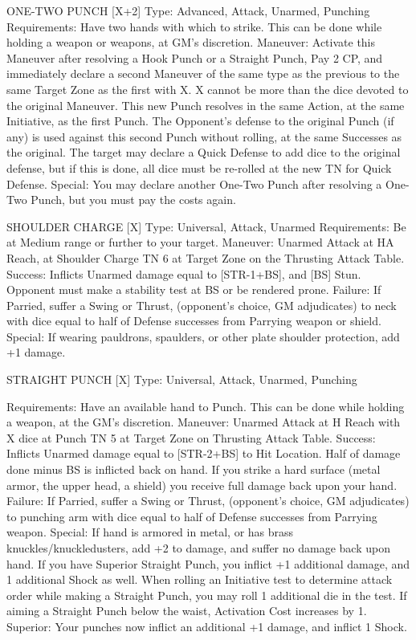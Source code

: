 \documentclass[oneside,11pt,english]{book}
\begin{document}
ONE-TWO PUNCH [X+2] 
Type: Advanced, Attack, Unarmed, Punching 
Requirements: Have two hands with which to strike. This can be done while holding a weapon or 
weapons, at GM’s discretion. 
Maneuver: Activate this Maneuver after resolving a Hook Punch or a Straight Punch, Pay 2 CP, and 
immediately declare a second Maneuver of the same type as the previous to the same Target Zone as the 
first with X. X cannot be more than the dice devoted to the original Maneuver. This new Punch resolves 
in the same Action, at the same Initiative, as the first Punch. The Opponent’s defense to the original 
Punch (if any) is used against this second Punch without rolling, at the same Successes as the original. 
The target may declare a Quick Defense to add dice to the original defense, but if this is done, all dice 
must be re-rolled at the new TN for Quick Defense. 
Special: You may declare another One-Two Punch after resolving a One-Two Punch, but you must pay 
the costs again. 

 

SHOULDER CHARGE [X] 
Type: Universal, Attack, Unarmed 
Requirements: Be at Medium range or further to your target. 
Maneuver: Unarmed Attack at HA Reach, at Shoulder Charge TN 6 at Target Zone on the Thrusting 
Attack Table. 
Success: Inflicts Unarmed damage equal to [STR-1+BS], and [BS] Stun. Opponent must make a stability 
test at BS or be rendered prone. 
Failure: If Parried, suffer a Swing or Thrust, (opponent’s choice, GM adjudicates) to neck with dice 
equal to half of Defense successes from Parrying weapon or shield. 
Special: If wearing pauldrons, spaulders, or other plate shoulder protection, add +1 damage. 

 

STRAIGHT PUNCH [X] 
Type: Universal, Attack, Unarmed, Punching 


Requirements: Have an available hand to Punch. This can be done while holding a weapon, at the GM's 
discretion. 
Maneuver: Unarmed Attack at H Reach with X dice at Punch TN 5 at Target Zone on Thrusting Attack 
Table. 
Success: Inflicts Unarmed damage equal to [STR-2+BS] to Hit Location. Half of damage done minus BS 
is inflicted back on hand. If you strike a hard surface (metal armor, the upper head, a shield) you receive 
full damage back upon your hand. 
Failure: If Parried, suffer a Swing or Thrust, (opponent’s choice, GM adjudicates) to punching arm with 
dice equal to half of Defense successes from Parrying weapon. 
Special: If hand is armored in metal, or has brass knuckles/knuckledusters, add +2 to damage, and suffer 
no damage back upon hand. If you have Superior Straight Punch, you inflict +1 additional damage, and 1 
additional Shock as well. 
When rolling an Initiative test to determine attack order while making a Straight Punch, you may roll 1 
additional die in the test. 
If aiming a Straight Punch below the waist, Activation Cost increases by 1. 
Superior: Your punches now inflict an additional +1 damage, and inflict 1 Shock. 
\end{document}
